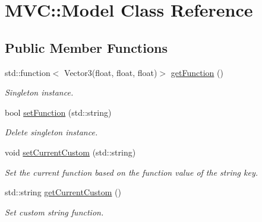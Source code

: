 \hypertarget{class_m_v_c_1_1_model}{}\section{M\+VC\+::Model Class Reference}
\label{class_m_v_c_1_1_model}
\subsection*{Public Member Functions}
\begin{DoxyCompactItemize}
\item 
\mbox{\label{class_m_v_c_1_1_model_adcbb4594bae45775c5ddbfa877edd2dc}} 
std\+::function$<$ Vector3(float, float, float)$>$ \mbox{\hyperlink{class_m_v_c_1_1_model_adcbb4594bae45775c5ddbfa877edd2dc}{get\+Function}} ()
\begin{DoxyCompactList}\small\item\em Singleton instance. \end{DoxyCompactList}\item 
\mbox{\label{class_m_v_c_1_1_model_a7e63652b86675fb302520c84bf4f6b6d}} 
bool \mbox{\hyperlink{class_m_v_c_1_1_model_a7e63652b86675fb302520c84bf4f6b6d}{set\+Function}} (std\+::string)
\begin{DoxyCompactList}\small\item\em Delete singleton instance. \end{DoxyCompactList}\item 
\mbox{\label{class_m_v_c_1_1_model_ad0caf9317ccb097dc2c858ea1489623c}} 
void \mbox{\hyperlink{class_m_v_c_1_1_model_ad0caf9317ccb097dc2c858ea1489623c}{set\+Current\+Custom}} (std\+::string)
\begin{DoxyCompactList}\small\item\em Set the current function based on the function value of the string key. \end{DoxyCompactList}\item 
\mbox{\label{class_m_v_c_1_1_model_a1426750923f35c7c88daf377190b367a}} 
std\+::string \mbox{\hyperlink{class_m_v_c_1_1_model_a1426750923f35c7c88daf377190b367a}{get\+Current\+Custom}} ()
\begin{DoxyCompactList}\small\item\em Set custom string function. \end{DoxyCompactList}\end{DoxyCompactItemize}
